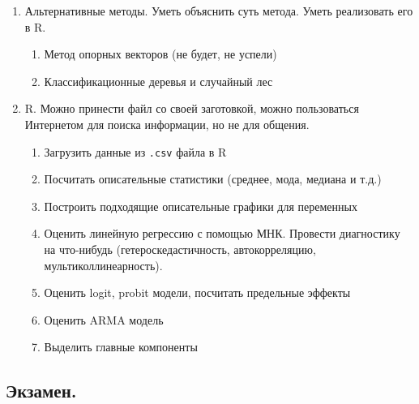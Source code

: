 \documentclass[12pt, a4paper]{article}\usepackage[]{graphicx}\usepackage[]{color}
\begin{document}
\begin{enumerate}
\item Альтернативные методы. Уметь объяснить суть метода. Уметь реализовать его в R. %
\begin{enumerate}
\item Метод опорных векторов (не будет, не успели)
\item Классификационные деревья и случайный лес
\end{enumerate}


\item R. Можно принести файл со своей заготовкой, можно пользоваться Интернетом для поиска информации, но не для общения.
\begin{enumerate}
\item Загрузить данные из \verb|.csv| файла в R
\item Посчитать описательные статистики (среднее, мода, медиана и т.д.)
\item Построить подходящие описательные графики для переменных
\item Оценить линейную регрессию с помощью МНК. Провести диагностику на что-нибудь (гетероскедастичность, автокорреляцию, мультиколлинеарность).
\item Оценить logit, probit модели, посчитать предельные эффекты
\item Оценить ARMA модель
\item Выделить главные компоненты
\end{enumerate}


\end{enumerate}



\subsection{Экзамен.}
\end{document}
